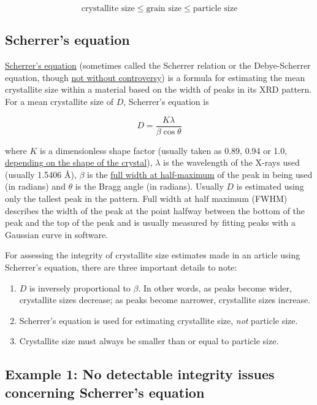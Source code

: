 \documentclass[letterpaper, 12pt]{article}
\begin{document}
$$ \text{crystallite size} \leq \text{grain size} \leq \text{particle size}$$

\subsection*{Scherrer's equation}

\href{}{Scherrer's equation} (sometimes called the Scherrer relation or the Debye-Scherrer equation, though \href{https://doi.org/10.1038/nnano.2011.145}{not without controversy}) is a formula for estimating the mean crystallite size within a material based on the width of peaks in its XRD pattern. For a mean crystallite size of $D$, Scherrer's equation is

$$ D = \frac{K \lambda}{\beta \cos \theta} $$

where $K$ is a dimensionless shape factor (usually taken as 0.89, 0.94 or 1.0, \href{https://doi.org/10.1107/S0021889878012844}{depending on the shape of the crystal}), $\lambda$ is the wavelength of the X-rays used (usually 1.5406 \r{A}), $\beta$ is the \href{https://en.wikipedia.org/wiki/Full_width_at_half_maximum}{full width at half-maximum} of the peak in being used (in radians) and $\theta$ is the Bragg angle (in radians). Usually $D$ is estimated using only the tallest peak in the pattern. Full width at half maximum (FWHM) describes the width of the peak at the point halfway between the bottom of the peak and the top of the peak and is usually measured by fitting peaks with a Gaussian curve in software.

For assessing the integrity of crystallite size estimates made in an article using Scherrer's equation, there are three important details to note:

\begin{enumerate}
    \setlength\itemsep{-0.5em}
    \item $D$ is inversely proportional to $\beta$. In other words, as peaks become wider, crystallite sizes decrease; as peaks become narrower, crystallite sizes increase.
    \item Scherrer's equation is used for estimating crystallite size, \textit{not} particle size.
    \item Crystallite size must always be smaller than or equal to particle size.
\end{enumerate}

\subsection*{Example 1: No detectable integrity issues concerning Scherrer's equation}
\end{document}
